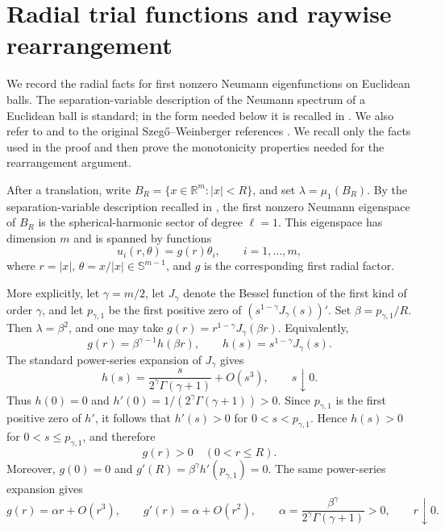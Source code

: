 \documentclass[11pt,letterpaper,reqno]{amsart}
\theoremstyle{definition}
\newcommand{\Sph}{\mathbb S}
\begin{document}
\section{Radial trial functions and raywise rearrangement}\label{sec:radial}

We record the radial facts for first nonzero Neumann eigenfunctions on
Euclidean balls. The separation-variable description of the Neumann
spectrum of a Euclidean ball is standard; in the form needed below it is
recalled in \cite[Section~2]{XW23}. We also refer to
\cite[{\S}1.2.3 and {\S}5.3.1]{LMP23} and to the original
Szeg\H{o}--Weinberger references \cite{Sze54,Wei56}. We recall only the
facts used in the proof and then prove the monotonicity properties needed
for the rearrangement argument.

After a translation, write \(B_R=\{x\in\mathbb R^m: |x|<R\}\), and set $\lambda=\mu_1(B_R)$. By the separation-variable description recalled in
\cite[Section~2]{XW23}, the first nonzero Neumann eigenspace of \(B_R\)
is the spherical-harmonic sector of degree \(\ell=1\). This eigenspace has
dimension \(m\) and is spanned by functions
\[
        u_i(r,\theta)=g(r)\theta_i,
        \qquad i=1,\ldots,m,
\]
where \(r=|x|\), \(\theta=x/|x|\in\Sph^{m-1}\), and \(g\) is the
corresponding first radial factor.

More explicitly, let \(\gamma=m/2\), let \(J_\gamma\) denote the Bessel function
of the first kind of order \(\gamma\), and let \(p_{\gamma,1}\) be the first
positive zero of $\left(s^{1-\gamma}J_\gamma(s)\right)'$. Set $\beta=p_{\gamma,1}/R$. Then \(\lambda=\beta^2\), and one may take $g(r)=r^{1-\gamma}J_\gamma(\beta r)$. Equivalently,
\[
        g(r)=\beta^{\gamma-1}h(\beta r),
        \qquad
        h(s)=s^{1-\gamma}J_\gamma(s).
\]
The standard power-series expansion of \(J_\gamma\) gives
\[
        h(s)=\frac{s}{2^\gamma\Gamma(\gamma+1)}+O(s^3),
        \qquad s\downarrow0.
\]
Thus \(h(0)=0\) and \(h'(0)=1/(2^\gamma\Gamma(\gamma+1))>0\). Since
\(p_{\gamma,1}\) is the first positive zero of \(h'\), it follows that
\(h'(s)>0\) for \(0<s<p_{\gamma,1}\). Hence \(h(s)>0\) for
\(0<s\le p_{\gamma,1}\), and therefore
\[
        g(r)>0\quad(0<r\le R).
\]
Moreover, $g(0)=0$ and $g'(R)=\beta^\gamma h'(p_{\gamma,1})=0$. The same power-series expansion gives
\[
        g(r)=\alpha r+O(r^3),\qquad
        g'(r)=\alpha+O(r^2),
        \qquad
        \alpha=\frac{\beta^\gamma}{2^\gamma\Gamma(\gamma+1)}>0,
        \qquad r\downarrow0.
\]
\end{document}
